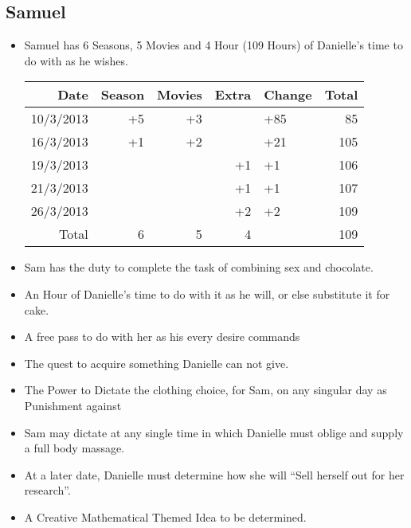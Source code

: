    \subsection{Samuel}
   \begin{itemize}
     \item Samuel has 6 Seasons, 5 Movies and 4 Hour (109 Hours) of Danielle's time to do with as he wishes.\\
     \begin{tabular}{r|rrr|l||r}
 		Date&Season&Movies&Extra&Change&Total\\
 		\hline
 		10/3/2013&+5&+3	&	&+85	&85 \\
 		16/3/2013&+1&+2	&	&+21	&105\\
 		19/3/2013&	&	&+1	&+1		&106\\
 		21/3/2013&	&	&+1	&+1		&107\\
 		26/3/2013&	&	&+2	&+2		&109\\
 		\hline
 		\hline
 		Total&6&5&4&&109
 	\end{tabular}
     \item Sam has the duty to complete the task of combining sex and chocolate.
     \item An Hour of Danielle's time to do with it as he will, or else substitute it for cake.
     \item A free pass to do with her as his every desire commands
     \item The quest to acquire something Danielle can not give.
     \item The Power to Dictate the clothing choice, for Sam, on any singular day as Punishment against
     \item Sam may dictate at any single time in which Danielle must oblige and supply a full body massage.
     \item At a later date, Danielle must determine how she will ``Sell herself out for her research''.
     \item A Creative Mathematical Themed Idea to be determined.
   \end{itemize}
    